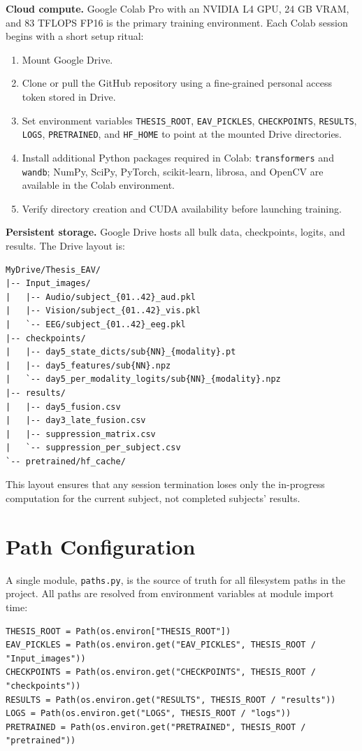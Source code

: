 \textbf{Cloud compute.} Google Colab Pro with an NVIDIA L4 GPU, 24 GB VRAM, and 83 TFLOPS FP16 is the primary training environment. Each Colab session begins with a short setup ritual:
\begin{enumerate}
    \item Mount Google Drive.
    \item Clone or pull the GitHub repository using a fine-grained personal access token stored in Drive.
    \item Set environment variables \texttt{THESIS\_ROOT}, \texttt{EAV\_PICKLES}, \texttt{CHECKPOINTS}, \texttt{RESULTS}, \texttt{LOGS}, \texttt{PRETRAINED}, and \texttt{HF\_HOME} to point at the mounted Drive directories.
    \item Install additional Python packages required in Colab: \texttt{transformers} and \texttt{wandb}; NumPy, SciPy, PyTorch, scikit-learn, librosa, and OpenCV are available in the Colab environment.
    \item Verify directory creation and CUDA availability before launching training.
\end{enumerate}

\textbf{Persistent storage.} Google Drive hosts all bulk data, checkpoints, logits, and results. The Drive layout is:

\begin{verbatim}
MyDrive/Thesis_EAV/
|-- Input_images/
|   |-- Audio/subject_{01..42}_aud.pkl
|   |-- Vision/subject_{01..42}_vis.pkl
|   `-- EEG/subject_{01..42}_eeg.pkl
|-- checkpoints/
|   |-- day5_state_dicts/sub{NN}_{modality}.pt
|   |-- day5_features/sub{NN}.npz
|   `-- day5_per_modality_logits/sub{NN}_{modality}.npz
|-- results/
|   |-- day5_fusion.csv
|   |-- day3_late_fusion.csv
|   |-- suppression_matrix.csv
|   `-- suppression_per_subject.csv
`-- pretrained/hf_cache/
\end{verbatim}

This layout ensures that any session termination loses only the in-progress computation for the current subject, not completed subjects' results.

\section{Path Configuration}
\label{sec:path_configuration}
A single module, \texttt{paths.py}, is the source of truth for all filesystem paths in the project. All paths are resolved from environment variables at module import time:

\begin{verbatim}
THESIS_ROOT = Path(os.environ["THESIS_ROOT"])
EAV_PICKLES = Path(os.environ.get("EAV_PICKLES", THESIS_ROOT / "Input_images"))
CHECKPOINTS = Path(os.environ.get("CHECKPOINTS", THESIS_ROOT / "checkpoints"))
RESULTS = Path(os.environ.get("RESULTS", THESIS_ROOT / "results"))
LOGS = Path(os.environ.get("LOGS", THESIS_ROOT / "logs"))
PRETRAINED = Path(os.environ.get("PRETRAINED", THESIS_ROOT / "pretrained"))
\end{verbatim}

